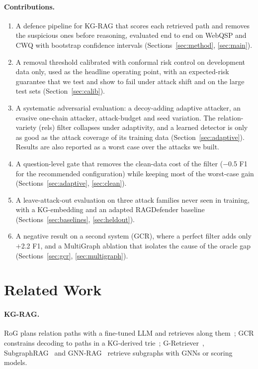 \documentclass[preprint,12pt]{elsarticle}
\begin{document}
\paragraph{Contributions.}
\begin{enumerate}[leftmargin=*,itemsep=2pt]
\item A defence pipeline for KG-RAG that scores each retrieved path and removes the suspicious ones before reasoning, evaluated end to end on WebQSP and CWQ with bootstrap confidence intervals (Sections~\ref{sec:method}, \ref{sec:main}).
\item A removal threshold calibrated with conformal risk control on development data only, used as the headline operating point, with an expected-risk guarantee that we test and show to fail under attack shift and on the large test sets (Section~\ref{sec:calib}).
\item A systematic adversarial evaluation: a decoy-adding adaptive attacker, an evasive one-chain attacker, attack-budget and seed variation. The relation-variety (rels) filter collapses under adaptivity, and a learned detector is only as good as the attack coverage of its training data (Section~\ref{sec:adaptive}). Results are also reported as a worst case over the attacks we built.
\item A question-level gate that removes the clean-data cost of the filter ($-$0.5 F1 for the recommended configuration) while keeping most of the worst-case gain (Sections~\ref{sec:adaptive}, \ref{sec:clean}).
\item A leave-attack-out evaluation on three attack families never seen in training, with a KG-embedding and an adapted RAGDefender baseline (Sections~\ref{sec:baselines}, \ref{sec:heldout}).
\item A negative result on a second system (GCR), where a perfect filter adds only $+$2.2 F1, and a MultiGraph ablation that isolates the cause of the oracle gap (Sections~\ref{sec:gcr}, \ref{sec:multigraph}).
\end{enumerate}

\section{Related Work}
\paragraph{KG-RAG.} RoG plans relation paths with a fine-tuned LLM and retrieves along them~\cite{luo2024rog}; GCR constrains decoding to paths in a KG-derived trie~\cite{luo2024gcr}; G-Retriever~\cite{he2024gretriever}, SubgraphRAG~\cite{li2025subgraphrag} and GNN-RAG~\cite{mavromatis2024} retrieve subgraphs with GNNs or scoring models.
\end{document}
